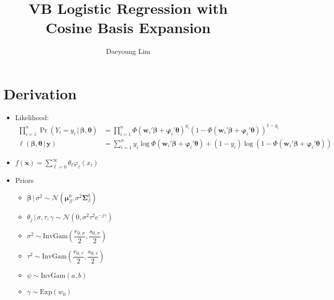 \documentclass{elsarticle}
\begin{document}
\begin{frontmatter}

\title{VB Logistic Regression with Cosine Basis Expansion}
\author{Daeyoung Lim}


\end{frontmatter}

\linenumbers
\section{Derivation}
\begin{itemize}
  \item Likelihood:
  \begin{align}
    \prod_{i=1}^{n}\Pr\left(Y_{i}=y_{i}\,|\,\bm{\beta},\bm{\theta}\right) &= \prod_{i=1}^{n}\Phi\left(\mathbf{w}_{i}'\bm{\beta}+\bm{\varphi}_{i}'\bm{\theta}\right)^{y_{i}}\left(1-\Phi\left(\mathbf{w}_{i}'\bm{\beta}+\bm{\varphi}_{i}'\bm{\theta}\right)\right)^{1-y_{i}}\\
    \ell\left(\bm{\beta},\bm{\theta}\,|\,\mathbf{y}\right) &= \sum_{i=1}^{n}y_{i}\log\Phi\left(\mathbf{w}_{i}'\bm{\beta}+\bm{\varphi}_{i}'\bm{\theta}\right)+\left(1-y_{i}\right)\log\left(1-\Phi\left(\mathbf{w}_{i}'\bm{\beta}+\bm{\varphi}_{i}'\bm{\theta}\right)\right)
  \end{align}
  \item $f(\mathbf{x})=\displaystyle \sum_{\ell=0}^{\infty} \theta_{\ell}\varphi_{\ell}\left(x_{i}\right)$
  \item Priors
  \begin{itemize}
    \item $\bm{\beta}\,|\,\sigma^{2}\sim\mathcal{N}\left(\bm{\mu}_{\beta}^{0},\sigma^{2}\bm{\Sigma}_{\beta}^{0}\right)$
    \item $\theta_{j}\,|\,\sigma,\tau,\gamma \sim \mathcal{N}\left(0,\sigma^{2}\tau^{2}e^{-j\gamma}\right)$
    \item $\sigma^{2} \sim \mathrm{InvGam}\left(\dfrac{r_{0,\sigma}}{2},\dfrac{s_{0,\sigma}}{2}\right)$
    \item $\tau^{2} \sim \mathrm{InvGam}\left(\dfrac{r_{0,\tau}}{2},\dfrac{s_{0,\tau}}{2}\right)$
    \item $\psi \sim \mathrm{InvGam}(a,b)$
    \item $\gamma\sim\mathrm{Exp}\left(w_{0}\right)$

\end{itemize}
\end{itemize}
\end{document}

